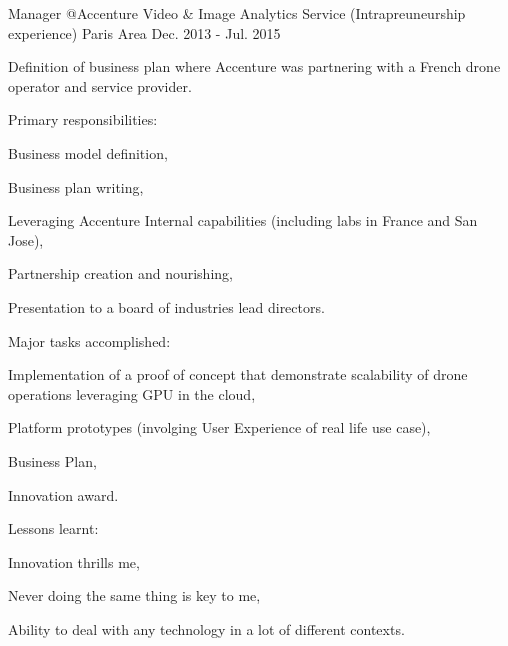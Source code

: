 

\begin{cventries}

  \cventry
    {Manager @Accenture} %
    {Video \& Image Analytics Service (Intrapreuneurship experience)} %
    {Paris Area} %
    {Dec. 2013 - Jul. 2015} %
    {
      \begin{cvitems} %
        \item {Definition of business plan where Accenture was partnering with a French drone operator and service provider.}
        \item {Primary responsibilities:}
        \begin{cvsubitems}
          \item {Business model definition,}
          \item {Business plan writing,}
          \item {Leveraging Accenture Internal capabilities (including labs in France and San Jose),}
          \item {Partnership creation and nourishing,}
          \item {Presentation to a board of industries lead directors.}
        \end{cvsubitems}
        \item {Major tasks accomplished:}
        \begin{cvsubitems}
          \item {Implementation of a proof of concept that demonstrate scalability of drone operations leveraging GPU in the cloud,}
          \item {Platform prototypes (involging User Experience of real life use case),}
          \item {Business Plan,}
          \item {Innovation award.}
        \end{cvsubitems}
        \item {Lessons learnt:}
        \begin{cvsubitems}
          \item {Innovation thrills me,}
          \item {Never doing the same thing is key to me,}
          \item {Ability to deal with any technology in a lot of different contexts.}
        \end{cvsubitems}
      \end{cvitems}
    }


\end{cventries}

